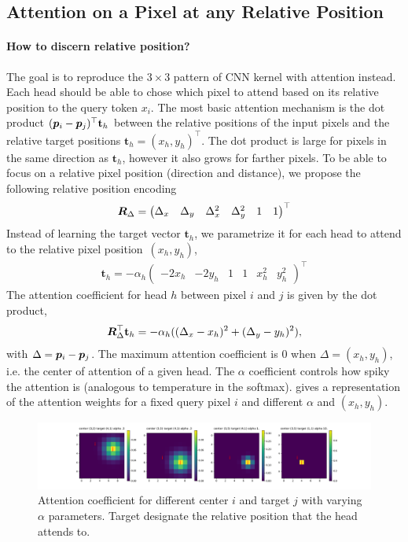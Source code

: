 \documentclass{article} %
\begin{document}
\subsection{Attention on a Pixel at any Relative Position}

\paragraph{How to discern relative position?} The goal is to reproduce the $3\times 3$ pattern of CNN kernel with attention instead.
Each head should be able to chose which pixel to attend based on its relative position to the query token $x_i$.
The most basic attention mechanism is the dot product $({\bm{p}}_i - {\bm{p}}_j)^\top \mathbf{t}_h$ between the relative positions of the input pixels and the relative target positions $\mathbf{t}_h = (x_h, y_h)^\top$.
The dot product is large for pixels in the same direction as $\mathbf{t}_h$, however it also grows for farther pixels. To be able to focus on a relative pixel position (direction and distance), we propose the following relative position encoding
\begin{align}
  {\bm{R}}_{\Delta} = 
  \begin{pmatrix} 
  \Delta_x& \Delta_y& \Delta_x^2& \Delta_y^2& 1& 1
  \end{pmatrix}^\top
\end{align}
Instead of learning the target vector $\mathbf{t}_h$, we parametrize it for each head to attend to the relative pixel position~$(x_h, y_h)$,
\begin{align}
  \mathbf{t}_h= 
  -\alpha_h \begin{pmatrix} 
  -2 x_h& -2 y_h& 1& 1&  x_h^2&  y_h^2
  \end{pmatrix}^\top
\end{align}
The attention coefficient for head $h$ between pixel $i$ and $j$ is given by the dot product,
\begin{align}
  {\bm{R}}_{\Delta}^\top \mathbf{t}_h = -\alpha_h ( (\Delta_x - x_h)^2 + (\Delta_y - y_h) ^2 ),
\end{align}
with $\Delta = {\bm{p}}_i - {\bm{p}}_j$. 
The maximum attention coefficient is 0 when $\Delta = (x_h, y_h)$, i.e. the center of attention of a given head.
The $\alpha$ coefficient controls how spiky the attention is (analogous to temperature in the softmax).
 gives a representation of the attention weights for a fixed query pixel $i$ and different $\alpha$ and $(x_h, y_h)$.

\begin{figure}[h]
  \centering
  \includegraphics[width=1\linewidth]{plots/conv_attention.pdf}
  \caption{Attention coefficient for different center $i$ and target $j$ with varying $\alpha$ parameters. Target designate the relative position that the head attends to.}
  \label{fig:attention_cnn}
\end{figure}
\end{document}
